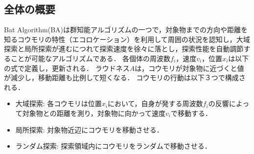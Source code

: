 \documentclass{jarticle}
\begin{document}
\subsection{全体の概要}
Bat Algorithm(BA)は群知能アルゴリズムの一つで，対象物までの方向や距離を知るコウモリの特性（エコロケーション）を利用して周囲の状況を認知し，大域探索と局所探索が進むにつれて探索速度を徐々に落とし，探索性能を自動調節することが可能なアルゴリズムである．
各個体の周波数${f_i}$，速度${v_i}$，位置${x_i}$は以下の式で定義し，更新される．
ラウドネス${A}$は，コウモリが対象物に近づくと値が減少し，移動距離も比例して短くなる．
コウモリの行動は以下３つで構成される．
\begin{itemize}
\item 大域探索: 各コウモリは位置${x_i}$において，自身が発する周波数${f_i}$の反響によって対象物との距離を測り，対象物に向かって速度${v_i}$で移動する．
\item 局所探索: 対象物近辺にコウモリを移動させる．
\item ランダム探索: 探索領域内にコウモリをランダムで移動させる．
\end{itemize}
\end{document}
